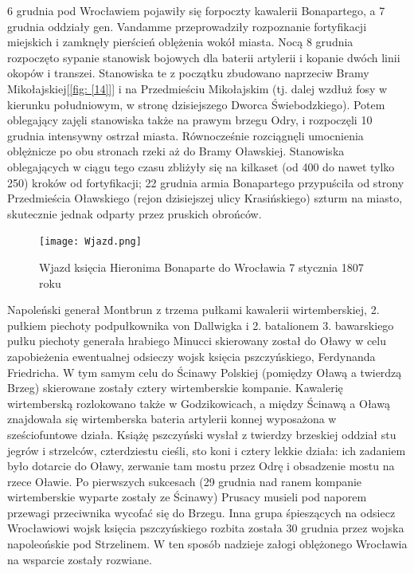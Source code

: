 \documentclass{article}
\begin{document}
6 grudnia pod Wrocławiem pojawiły się forpoczty kawalerii Bonapartego, a 7 grudnia oddziały gen. Vandamme przeprowadziły rozpoznanie fortyfikacji miejskich i zamknęły pierścień oblężenia wokół miasta. Nocą 8 grudnia rozpoczęto sypanie stanowisk bojowych dla baterii artylerii i kopanie dwóch linii okopów i transzei. Stanowiska te z początku zbudowano naprzeciw Bramy Mikołajskiej[\ref{fig: [14]}] i na Przedmieściu Mikołajskim (tj. dalej wzdłuż fosy w kierunku południowym, w stronę dzisiejszego Dworca Świebodzkiego). Potem oblegający zajęli stanowiska także na prawym brzegu Odry, i rozpoczęli 10 grudnia intensywny ostrzał miasta. Równocześnie rozciągnęli umocnienia oblężnicze po obu stronach rzeki aż do Bramy Oławskiej. Stanowiska oblegających w ciągu tego czasu zbliżyły się na kilkaset (od 400 do nawet tylko 250) kroków od fortyfikacji; 22 grudnia armia Bonapartego przypuściła od strony Przedmieścia Oławskiego (rejon dzisiejszej ulicy Krasińskiego) szturm na miasto, skutecznie jednak odparty przez pruskich obrońców.

\begin{center}
\begin{figure}[h]
	\centering
	\texttt{[image: Wjazd.png]}
	\caption{Wjazd księcia Hieronima Bonaparte do Wrocławia 7 stycznia 1807 roku}
\end{figure}
\end{center}

Napoleński generał Montbrun z trzema pułkami kawalerii wirtemberskiej, 2. pułkiem piechoty podpułkownika von Dallwigka i 2. batalionem 3. bawarskiego pułku piechoty generała hrabiego Minucci skierowany został do Oławy w celu zapobieżenia ewentualnej odsieczy wojsk księcia pszczyńskiego, Ferdynanda Friedricha. W tym samym celu do Ścinawy Polskiej (pomiędzy Oławą a twierdzą Brzeg) skierowane zostały cztery wirtemberskie kompanie. Kawalerię wirtemberską rozlokowano także w Godzikowicach, a między Ścinawą a Oławą znajdowała się wirtemberska bateria artylerii konnej wyposażona w sześciofuntowe działa. Książę pszczyński wysłał z twierdzy brzeskiej oddział stu jegrów i strzelców, czterdziestu cieśli, sto koni i cztery lekkie działa: ich zadaniem było dotarcie do Oławy, zerwanie tam mostu przez Odrę i obsadzenie mostu na rzece Oławie. Po pierwszych sukcesach (29 grudnia nad ranem kompanie wirtemberskie wyparte zostały ze Ścinawy) Prusacy musieli pod naporem przewagi przeciwnika wycofać się do Brzegu. Inna grupa śpieszących na odsiecz Wrocławiowi wojsk księcia pszczyńskiego rozbita została 30 grudnia przez wojska napoleońskie pod Strzelinem. W ten sposób nadzieje załogi oblężonego Wrocławia na wsparcie zostały rozwiane.
\end{document}
